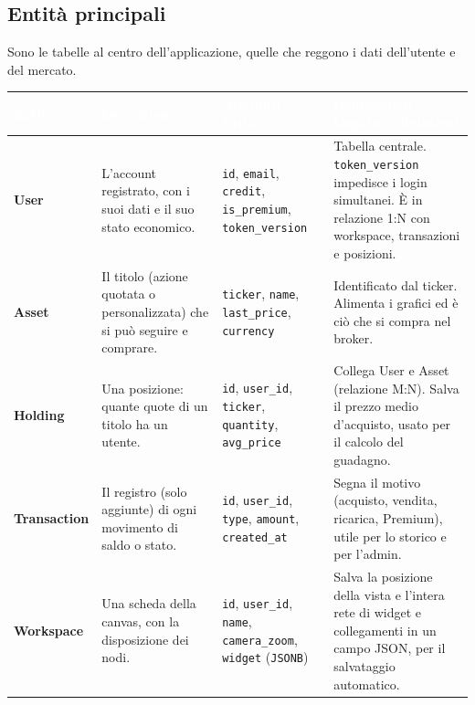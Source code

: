 \subsection{Entità principali}
Sono le tabelle al centro dell'applicazione, quelle che reggono i dati dell'utente e del mercato.

\begin{table}[H]
\centering
{}
\renewcommand{\arraystretch}{1.3}
\begin{tabularx}{\textwidth}{|l|X|p{3.5cm}|X|}
\hline
\rowcolor[HTML]{3B3766}
\textcolor{white}{\textbf{Entità}} & \textcolor{white}{\textbf{Descrizione}} & \textcolor{white}{\textbf{Attributi Critici}} & \textcolor{white}{\textbf{Implicazioni Logiche / Relazioni}} \\ \hline
\textbf{User} & L'account registrato, con i suoi dati e il suo stato economico. & \texttt{id}, \texttt{email}, \texttt{credit}, \texttt{is\_\allowbreak{}premium}, \texttt{token\_\allowbreak{}version} & Tabella centrale. \texttt{token\_\allowbreak{}version} impedisce i login simultanei. È in relazione 1:N con workspace, transazioni e posizioni. \\ \hline
\textbf{Asset} & Il titolo (azione quotata o personalizzata) che si può seguire e comprare. & \texttt{ticker}, \texttt{name}, \texttt{last\_\allowbreak{}price}, \texttt{currency} & Identificato dal ticker. Alimenta i grafici ed è ciò che si compra nel broker. \\ \hline
\textbf{Holding} & Una posizione: quante quote di un titolo ha un utente. & \texttt{id}, \texttt{user\_\allowbreak{}id}, \texttt{ticker}, \texttt{quantity}, \texttt{avg\_\allowbreak{}price} & Collega User e Asset (relazione M:N). Salva il prezzo medio d'acquisto, usato per il calcolo del guadagno. \\ \hline
\textbf{Transaction} & Il registro (solo aggiunte) di ogni movimento di saldo o stato. & \texttt{id}, \texttt{user\_\allowbreak{}id}, \texttt{type}, \texttt{amount}, \texttt{created\_\allowbreak{}at} & Segna il motivo (acquisto, vendita, ricarica, Premium), utile per lo storico e per l'admin. \\ \hline
\textbf{Workspace} & Una scheda della canvas, con la disposizione dei nodi. & \texttt{id}, \texttt{user\_\allowbreak{}id}, \texttt{name}, \texttt{camera\_\allowbreak{}zoom}, \texttt{widget} (\texttt{JSONB}) & Salva la posizione della vista e l'intera rete di widget e collegamenti in un campo JSON, per il salvataggio automatico. \\ \hline
\end{tabularx}
\end{table}

